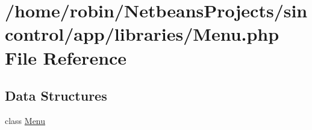 \hypertarget{_menu_8php}{}\section{/home/robin/\+Netbeans\+Projects/sincontrol/app/libraries/\+Menu.php File Reference}
\label{_menu_8php}
\subsection*{Data Structures}
\begin{DoxyCompactItemize}
\item 
class \hyperlink{class_menu}{Menu}
\end{DoxyCompactItemize}
